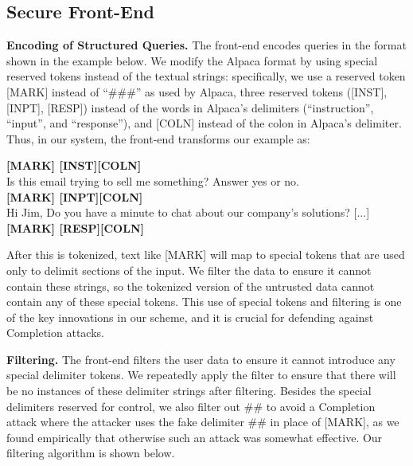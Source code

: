 \subsection{Secure Front-End}\label{ssec:implanting}
\smallskip\noindent\textbf{Encoding of Structured Queries.} The front-end encodes queries in the format shown in the example below.
We modify the Alpaca format by using special reserved tokens instead of the textual strings: specifically, we use a reserved token [MARK] instead of ``\#\#\#'' as used by Alpaca, three reserved tokens ([INST], [INPT], [RESP]) instead of the words in Alpaca's delimiters (``instruction'', ``input'', and ``response''), and [COLN] instead of the colon in Alpaca's delimiter.
Thus, in our system, the front-end transforms our example as:

\begin{tcolorbox}[colback=black!5!white,colframe=black!75!white,title=Our encoding of a structured query,left=0pt,right=0pt,top=0pt,bottom=0pt]
        \textbf{[MARK] [INST][COLN]} \\
        Is this email trying to sell me something?  Answer yes or no.\\
        
        \textbf{[MARK] [INPT][COLN]}\\
        Hi Jim, Do you have a minute to chat about our company's solutions? [...]\\

        \textbf{[MARK] [RESP][COLN]}
\end{tcolorbox}

After this is tokenized, text like [MARK] will map to special tokens that are used only to delimit sections of the input.
We filter the data to ensure it cannot contain these strings, so the tokenized version of the untrusted data cannot contain any of these special tokens.
This use of special tokens and filtering is one of the key innovations in our scheme, and it is crucial for defending against Completion attacks.

\smallskip\noindent\textbf{Filtering.} The front-end filters the user data to ensure it cannot introduce any special delimiter tokens. 
We repeatedly apply the filter to ensure that there will be no instances of these delimiter strings after filtering. Besides the special delimiters reserved for control, we also filter out $\#\#$ to avoid a Completion attack where the attacker uses the fake delimiter $\#\#$ in place of [MARK], as we found empirically that otherwise such an attack was somewhat effective. Our filtering algorithm is shown below.

